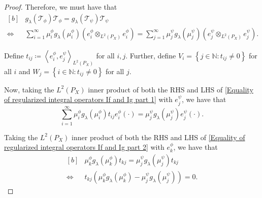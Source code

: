 \documentclass{article} %
\newcommand{\repone}{\phi}
\newcommand{\reptwo}{\psi}
\newcommand{\Tone}{\mathcal{T}_{\repone}}
\newcommand{\Ttwo}{\mathcal{T}_{\reptwo}}
\newcommand{\gl}{g_{\lambda}}
\newcommand{\inprod}[1]{\left \langle #1 \right\rangle}
\newcommand{\LPtwo}{L^{2}(P_{X})}
\theoremstyle{plain}
\begin{document}
\begin{proof}
    Therefore, we must have that
    \begin{equation}\label{Equality of regularized integral operators If and Ig part 1}
        \begin{aligned}[b]
            &\gl(\Tone)\Tone = \gl(\Ttwo)\Ttwo\\
            \iff & \sum_{i=1}^{\infty} \mu_{i}^{\repone}\gl(\mu_{i}^{\repone}) \left(e_{i}^{\repone} \otimes_{\LPtwo} e_{i}^{\repone}\right) = \sum_{j=1}^{\infty} \mu_{j}^{\reptwo} \gl(\mu_{j}^{\reptwo}) \left(e_{j}^{\reptwo} \otimes_{\LPtwo} e_{j}^{\reptwo}\right).
        \end{aligned}
    \end{equation}

    Define $t_{ij} \coloneq \inprod{e_{i}^{\repone},e_{j}^{\reptwo}}_{\LPtwo}$ for all $i,j$. Further, define $V_{i} = \left\{j \in \mathbb{N} : t_{ij} \neq 0\right\}$ for all $i$ and $W_{j} = \left\{i \in \mathbb{N} : t_{ij} \neq 0\right\}$ for all $j$. 
    
    Now, taking the $\LPtwo$ inner product of both the RHS and LHS of \eqref{Equality of regularized integral operators If and Ig part 1} with $e_{j}^{\reptwo}$, we have that
    \begin{equation}\label{Equality of regularized integral operators If and Ig part 2}
        \sum_{i=1}^{\infty} \mu_{i}^{\repone} \gl(\mu_{i}^{\repone})t_{ij} e_{i}^{\repone}(\cdot) = \mu_{j}^{\reptwo}\gl(\mu_{j}^{\reptwo}) e_{j}^{\reptwo}(\cdot).
    \end{equation}

    Taking the $\LPtwo$ inner product of both the RHS and LHS of \eqref{Equality of regularized integral operators If and Ig part 2} with $e_{k}^{\repone}$, we have that
    \begin{equation}\label{Equality of regularized integral operators If and Ig part 3}
        \begin{aligned}[b]
            &\mu_{k}^{\repone} \gl(\mu_{k}^{\repone})t_{kj} = \mu_{j}^{\reptwo} \gl(\mu_{j}^{\reptwo})t_{kj}\\
            \iff & t_{kj} \left(\mu_{k}^{\repone} \gl(\mu_{k}^{\repone})- \mu_{j}^{\reptwo} \gl(\mu_{j}^{\reptwo})  \right) = 0.
        \end{aligned}
    \end{equation}



\end{proof}
\end{document}
